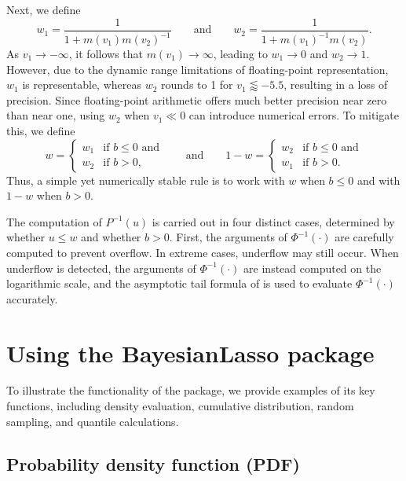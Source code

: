 Next, we define 
$$
w_{1}=\frac{1}{1+m\left(v_{1}\right)m\left(v_{2}\right)^{-1}}
\qquad 
\mbox{and}
\qquad 
w_{2}=\frac{1}{1+m\left(v_{1}\right)^{-1}m\left(v_{2}\right)}.
$$
As $v_{1}\rightarrow-\infty$, it follows that $m\left(v_{1}\right)\rightarrow\infty$, leading to $w_{1}\rightarrow0$ and $w_{2}\rightarrow1$.
However, due to the dynamic range limitations of floating-point representation, $w_{1}$
is representable, whereas  $w_{2}$ rounds to 1 for $v_{1}\lessapprox-5.5$,
resulting in a loss of precision. Since floating-point arithmetic offers much better precision near zero than near one, using $w_{2}$ when $v_{1}\ll0$ can introduce numerical errors. To mitigate this, we define
$$
w=\begin{cases}
w_{1} & \mbox{if } b\le0 \mbox{ and} \\
w_{2} & \mbox{if } b>0,
\end{cases}
\qquad \mbox{and}
\qquad 
1-w =\begin{cases}
w_{2} & \mbox{if } b\le0 \mbox{ and} \\
w_{1} & \mbox{if } b>0.
\end{cases}
$$
Thus, a simple yet numerically stable rule is to work with $w$ when $b\le0$ and with $1-w$
when $b>0$.

The computation of $P^{-1}(u)$ is carried out in four distinct cases, determined by whether $u \leq w$ and whether $b > 0$. First, the arguments of $\Phi^{-1}(\cdot)$ are carefully computed to prevent overflow. In extreme cases, underflow may still occur. When underflow is detected, the arguments of $\Phi^{-1}(\cdot)$ are instead computed on the logarithmic scale, and the asymptotic tail formula of \citet{Martin} is used to evaluate $\Phi^{-1}(\cdot)$ accurately.




\section{Using the BayesianLasso package}\label{Sec:UsingBayesPackage}

To illustrate the functionality of the  package, we provide examples of its key functions, including density evaluation, cumulative distribution, random sampling, and quantile calculations.

\subsection{Probability density function (PDF)}

